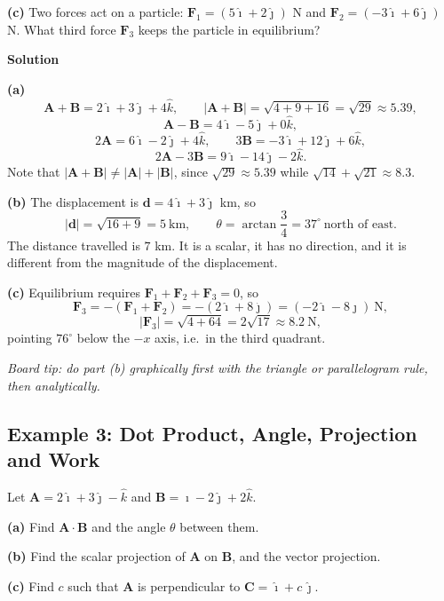 \documentclass[../main.tex]{subfiles}
\begin{document}
\textbf{(c)} Two forces act on a particle: $\mathbf{F}_1 = (5\hat{\imath}+2\hat{\jmath})$ N and $\mathbf{F}_2 = (-3\hat{\imath}+6\hat{\jmath})$ N. What third force $\mathbf{F}_3$ keeps the particle in equilibrium?

\bigskip
\textbf{Solution}

\textbf{(a)}
\[
\mathbf{A}+\mathbf{B} = 2\hat{\imath} + 3\hat{\jmath} + 4\hat{k},
\qquad
|\mathbf{A}+\mathbf{B}| = \sqrt{4+9+16} = \sqrt{29} \approx 5.39,
\]
\[
\mathbf{A}-\mathbf{B} = 4\hat{\imath} - 5\hat{\jmath} + 0\hat{k},
\]
\[
2\mathbf{A} = 6\hat{\imath}-2\hat{\jmath}+4\hat{k},
\qquad
3\mathbf{B} = -3\hat{\imath}+12\hat{\jmath}+6\hat{k},
\]
\[
2\mathbf{A}-3\mathbf{B} = 9\hat{\imath} - 14\hat{\jmath} - 2\hat{k}.
\]
Note that $|\mathbf{A}+\mathbf{B}| \neq |\mathbf{A}|+|\mathbf{B}|$, since $\sqrt{29}\approx 5.39$ while $\sqrt{14}+\sqrt{21}\approx 8.3$.

\textbf{(b)} The displacement is $\mathbf{d} = 4\hat{\imath}+3\hat{\jmath}$ km, so
\[
|\mathbf{d}| = \sqrt{16+9} = 5\ \text{km},
\qquad
\theta = \arctan\frac{3}{4} = 37^\circ \ \text{north of east}.
\]
The distance travelled is $7$ km. It is a scalar, it has no direction, and it is different from the magnitude of the displacement.

\textbf{(c)} Equilibrium requires $\mathbf{F}_1+\mathbf{F}_2+\mathbf{F}_3 = 0$, so
\[
\mathbf{F}_3 = -(\mathbf{F}_1+\mathbf{F}_2) = -(2\hat{\imath}+8\hat{\jmath}) = (-2\hat{\imath}-8\hat{\jmath})\ \text{N},
\]
\[
|\mathbf{F}_3| = \sqrt{4+64} = 2\sqrt{17} \approx 8.2\ \text{N},
\]
pointing $76^\circ$ below the $-x$ axis, i.e.\ in the third quadrant.

\bigskip
\noindent \emph{Board tip: do part (b) graphically first with the triangle or parallelogram rule, then analytically.}


\subsection{Example 3: Dot Product, Angle, Projection and Work}

Let $\mathbf{A} = 2\hat{\imath}+3\hat{\jmath}-\hat{k}$ and $\mathbf{B} = \hat{\imath}-2\hat{\jmath}+2\hat{k}$.

\textbf{(a)} Find $\mathbf{A}\cdot\mathbf{B}$ and the angle $\theta$ between them.

\textbf{(b)} Find the scalar projection of $\mathbf{A}$ on $\mathbf{B}$, and the vector projection.

\textbf{(c)} Find $c$ such that $\mathbf{A}$ is perpendicular to $\mathbf{C} = \hat{\imath} + c\,\hat{\jmath}$.
\end{document}
